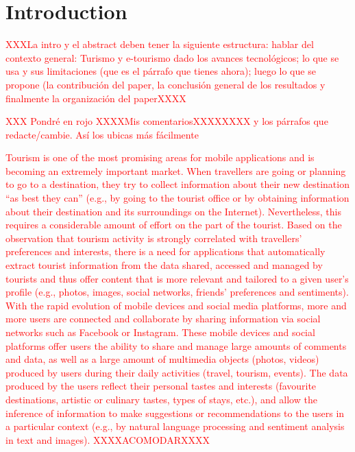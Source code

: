 \section{Introduction}
\textcolor{red}{XXXLa intro y el abstract deben tener la siguiente estructura: hablar del contexto general: Turismo y e-tourismo dado los avances tecnológicos; lo que se usa y sus limitaciones (que es el párrafo que tienes ahora); luego lo que se propone (la contribución del paper, la conclusión general de los resultados y finalmente la organización del paperXXXX}

\textcolor{red}{XXX Pondré en rojo XXXXMis comentariosXXXXXXXX y los párrafos que redacte/cambie. Así los ubicas más fácilmente}


\textcolor{red}{Tourism is one of the most promising areas for mobile applications and is becoming an extremely
important market\cite{buhalis2011tourism,murphy2013tourism,fermoso2015open,ku2015cultivating,alghamdi2016tourism,artemenko2017tourism}. 
When travellers are going or planning to go to a destination, they try to
collect information about their new destination “as best they can” (e.g., by going to the tourist
office or by obtaining information about their destination and its surroundings on the Internet).
Nevertheless, this requires a considerable amount of effort on the part of the tourist. Based on the
observation that tourism activity is strongly correlated with travellers’ preferences and interests,
there is a need for applications that automatically extract tourist information from the data shared,
accessed and managed by tourists and thus offer content that is more relevant and tailored to a
given user’s profile (e.g., photos, images, social networks, friends’ preferences and sentiments).
With the rapid evolution of mobile devices and social media platforms, more and more users are
connected and collaborate by sharing information via social networks such as Facebook or
Instagram. These mobile devices and social platforms offer users the ability to share and manage
large amounts of comments and data, as well as a large amount of multimedia objects (photos,
videos) produced by users during their daily activities (travel, tourism, events). The data produced
by the users reflect their personal tastes and interests (favourite destinations, artistic or culinary
tastes, types of stays, etc.), and allow the inference of information to make suggestions or
recommendations to the users in a particular context (e.g., by natural language processing and
sentiment analysis in text and images). XXXXACOMODARXXXX}



